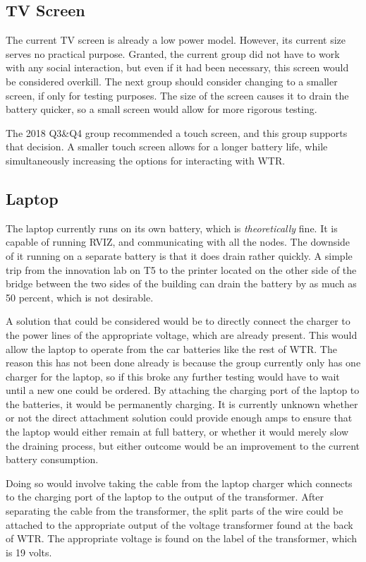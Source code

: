 \subsection{TV Screen}
The current TV screen is already a low power model.
However, its current size serves no practical purpose.
Granted, the current group did not have to work with any social interaction, but even if it had been necessary, this screen would be considered overkill.
The next group should consider changing to a smaller screen, if only for testing purposes.
The size of the screen causes it to drain the battery quicker, so a small screen would allow for more rigorous testing.

The 2018 Q3\&Q4 group recommended a touch screen, and this group supports that decision.
A smaller touch screen allows for a longer battery life, while simultaneously increasing the options for interacting with WTR.

\subsection{Laptop}
The laptop currently runs on its own battery, which is \textit{theoretically} fine.
It is capable of running RVIZ, and communicating with all the nodes.
The downside of it running on a separate battery is that it does drain rather quickly.
A simple trip from the innovation lab on T5 to the printer located on the other side of the bridge between the two sides of the building can drain the battery by as much as 50 percent, which is not desirable.


A solution that could be considered would be to directly connect the charger to the power lines of the appropriate voltage, which are already present.
This would allow the laptop to operate from the car batteries like the rest of WTR.
The reason this has not been done already is because the group currently only has one charger for the laptop, so if this broke any further testing would have to wait until a new one could be ordered.
By attaching the charging port of the laptop to the batteries, it would be permanently charging.
It is currently unknown whether or not the direct attachment solution could provide enough amps to ensure that the laptop would either remain at full battery, or whether it would merely slow the draining process, but either outcome would be an improvement to the current battery consumption.

Doing so would involve taking the cable from the laptop charger which connects to the charging port of the laptop to the output of the transformer.
After separating the cable from the transformer, the split parts of the wire could be attached to the appropriate output of the voltage transformer found at the back of WTR.
The appropriate voltage is found on the label of the transformer, which is 19 volts.

